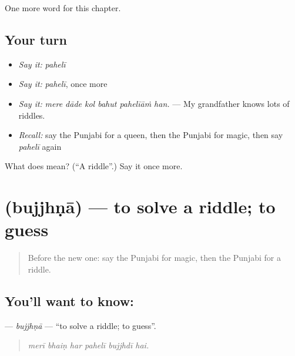 \begin{grammarlens}[title={What you've built}]
One more word for this chapter.
\end{grammarlens}

\subsection*{Your turn}
\begin{itemize}
\raggedright
  \item \emph{Say it:} \emph{pahelī}
  \item \emph{Say it:} \emph{pahelī}, once more
  \item \emph{Say it:} \emph{mere dāde kol bahut pahelīāṁ han.} — My grandfather knows lots of riddles.
  \item \emph{Recall:} say the Punjabi for a queen, then the Punjabi for magic, then say \emph{pahelī} again
\end{itemize}

\begin{tcolorbox}[breakable,colback=teal!4,colframe=teal!35!black,title={Before you move on}]
What does  mean? (\textquotedblleft{}A riddle\textquotedblright{}.) Say it once more.
\end{tcolorbox}
\section[\texorpdfstring{\pa{ਬੁੱਝਣਾ} (bujjhṇā)}{ਬੁੱਝਣਾ (bujjhṇā)}]{ (bujjhṇā) — to solve a riddle; to guess}

\label{lesson:PA-C355-bujjhna}



\begin{quote}
Before the new one: say the Punjabi for magic, then the Punjabi for a riddle.
\end{quote}

\subsection*{You'll want to know: }
\textbf{} — \emph{bujjhṇā} — \textquotedblleft{}to solve a riddle; to guess\textquotedblright{}.

\begin{quote}
     
\end{quote}

\begin{quote}
\emph{merī bhaiṇ har pahelī bujjhdī hai.}
\end{quote}

